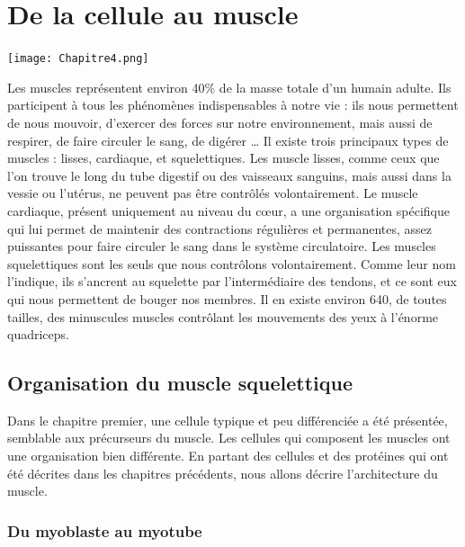 %
%
%
%
\chapter{De la cellule au muscle}


\begin{center}
\texttt{[image: Chapitre4.png]}
\end{center}
\newpage

Les muscles représentent environ 40\% de la masse totale d'un humain adulte. Ils participent à tous les phénomènes indispensables à notre vie : ils nous permettent de nous mouvoir, d'exercer des forces sur notre environnement, mais aussi de respirer, de faire circuler le sang, de digérer \dots 
Il existe trois principaux types de muscles : lisses, cardiaque, et squelettiques. Les muscle lisses, comme ceux que l'on trouve le long du tube digestif ou des vaisseaux sanguins, mais aussi dans la vessie ou l'utérus, ne peuvent pas être contrôlés volontairement. 
Le muscle cardiaque, présent uniquement au niveau du c\oe ur, a une organisation spécifique qui lui permet de maintenir des contractions régulières et permanentes, assez puissantes pour faire circuler le sang dans le système circulatoire. 
Les muscles squelettiques sont les seuls que nous contrôlons volontairement. Comme leur nom l'indique, ils s'ancrent au squelette par l'intermédiaire des tendons, et ce sont eux qui nous permettent de bouger nos membres.  
Il en existe environ 640, de toutes tailles, des minuscules muscles contrôlant les mouvements des yeux à l'énorme quadriceps.

\section{Organisation du muscle squelettique}

Dans le chapitre premier, une cellule typique et peu différenciée a été présentée, semblable aux précurseurs du muscle. Les cellules qui composent les muscles ont une organisation bien différente. 
En partant des cellules et des protéines qui ont été décrites dans les chapitres précédents, nous allons décrire l'architecture du muscle. 

\subsection{Du myoblaste au myotube}

